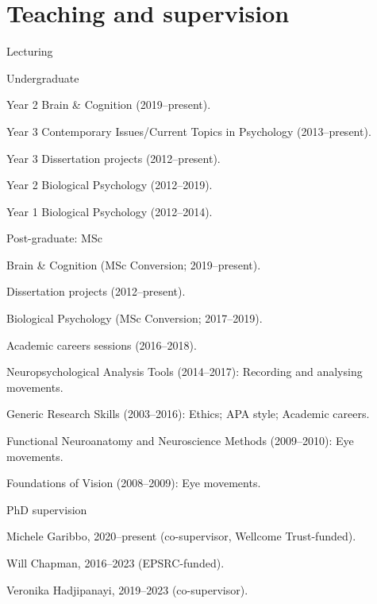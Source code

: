 \documentclass[a4paper, 10pt]{article}
\renewenvironment{itemize}{
  \begin{list}{}{
    \setlength{\leftmargin}{1.5em}
  }
}{
  \end{list}
}
\begin{document}
\section*{Teaching and supervision}
\begin{itemize}
\item Lecturing
    \begin{itemize}
    \item Undergraduate
    	\begin{itemize}
    	\item Year 2 Brain \& Cognition (2019--present).
    	\item Year 3 Contemporary Issues/Current Topics in Psychology (2013--present).
    	\item Year 3 Dissertation projects (2012--present).
    	\item Year 2 Biological Psychology (2012--2019).
    	\item Year 1 Biological Psychology (2012--2014).
    	\end{itemize}
    \item Post-graduate: MSc 
    	\begin{itemize}
    	\item Brain \& Cognition (MSc Conversion; 2019--present).
    	\item Dissertation projects (2012--present).
    	\item Biological Psychology (MSc Conversion; 2017--2019).
    	\item Academic careers sessions (2016--2018).
		\item Neuropsychological Analysis Tools (2014--2017): Recording and analysing movements.    	
    	\item Generic Research Skills (2003--2016): Ethics; APA style; Academic careers.
   	 	\item Functional Neuroanatomy and Neuroscience Methods (2009--2010): Eye movements.
    	\item Foundations of Vision (2008--2009): Eye movements.
    	\end{itemize}
    \end{itemize}
\item{PhD supervision}
    \begin{itemize}
    \item Michele Garibbo, 2020--present (co-supervisor, Wellcome Trust-funded). 
    \item Will Chapman, 2016--2023 (EPSRC-funded).
    \item Veronika Hadjipanayi, 2019--2023 (co-supervisor).

\end{itemize}
\end{itemize}
\end{document}
